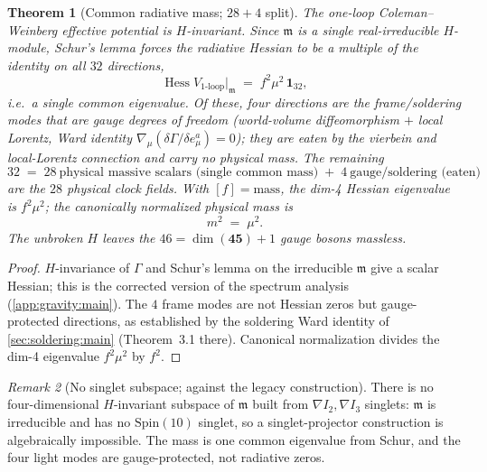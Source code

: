 \documentclass[11pt]{article}
\theoremstyle{plain}
\newtheorem{theorem}{Theorem}[section]
\theoremstyle{definition}
\theoremstyle{remark}
\newtheorem{remark}[theorem]{Remark}
\newcommand{\Hess}{\operatorname{Hess}}
\begin{document}
\begin{theorem}[Common radiative mass; $28+4$ split]
\label{thm:gravity:spectrum}
\label{thm:gravity:mass}
\label{thm:MassSpectrum}
The one-loop Coleman--Weinberg effective potential is $H$-invariant.
Since $\mathfrak m$ is a single real-irreducible $H$-module, Schur's lemma
forces the radiative Hessian to be a multiple of the identity on all
$32$ directions,
\[
  \Hess V_{\mathrm{1\text{-}loop}}\big|_{\mathfrak m}
  \;=\; f^{2}\mu^{2}\,\mathbf 1_{32},
\]
i.e.\ a single common eigenvalue. Of these, four directions are the
frame/soldering modes that are gauge degrees of freedom (world-volume
diffeomorphism $+$ local Lorentz, Ward identity
$\nabla_{\mu}(\delta\Gamma/\delta e^{a}_{\mu})=0$); they are eaten by the
vierbein and local-Lorentz connection and carry \emph{no} physical mass.
The remaining
\[
  32 \;=\; 28\ \text{physical massive scalars (single common mass)}\;+\;4\ \text{gauge/soldering (eaten)}
\]
are the $28$ physical clock fields. With $[f]=\text{mass}$, the dim-4
Hessian eigenvalue is $f^{2}\mu^{2}$; the canonically normalized physical
mass is
\[
  m^{2} \;=\; \mu^{2}.
\]
The unbroken $H$ leaves the $46=\dim(\mathbf{45})+1$ gauge bosons massless.
\end{theorem}

\begin{proof}
$H$-invariance of $\Gamma$ and Schur's lemma on the irreducible $\mathfrak m$
give a scalar Hessian; this is the corrected version of the spectrum
analysis (\autoref{app:gravity:main}). The $4$ frame modes are not Hessian
zeros but gauge-protected directions, as established by the soldering Ward
identity of \autoref{sec:soldering:main} (Theorem~3.1 there). Canonical
normalization divides the dim-4 eigenvalue $f^{2}\mu^{2}$ by $f^{2}$.
\end{proof}

\begin{remark}[No singlet subspace; against the legacy construction]
\label{rmk:gravity:nosinglet}
There is no four-dimensional $H$-invariant subspace of $\mathfrak m$ built
from $\nabla I_{2},\nabla I_{3}$ singlets: $\mathfrak m$ is irreducible and
has no $\mathrm{Spin}(10)$ singlet, so a singlet-projector construction is
algebraically impossible. The mass is one common eigenvalue from Schur, and
the four light modes are gauge-protected, not radiative zeros.
\end{remark}
\end{document}
